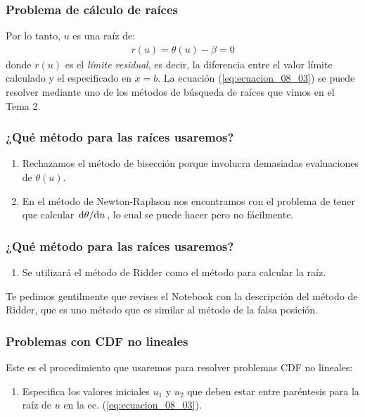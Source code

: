 \documentclass[12pt]{beamer}
\begin{document}
\begin{frame}
\frametitle{Problema de cálculo de raíces}
Por lo tanto, \pause $u$ es una raíz de:
\pause
\begin{align}
r (u) = \theta (u) - \beta = 0
\label{eq:ecuacion_08_03}
\end{align}
\pause
donde $r (u)$ es el \emph{límite residual}, es decir, la diferencia entre el valor límite calculado y el especificado en $x = b$. \pause La ecuación (\ref{eq:ecuacion_08_03}) se puede resolver mediante uno de los métodos de búsqueda de raíces que vimos en el Tema 2.
\end{frame}
\begin{frame}
\frametitle{¿Qué método para las raíces usaremos?}
\begin{enumerate}[<+->]
\item Rechazamos el método de bisección porque involucra demasiadas evaluaciones de $\theta (u)$.
\item En el método de Newton-Raphson nos encontramos con el problema de tener que calcular $\dv*{\theta}{u}$, lo cual se puede hacer pero no fácilmente.
\seti
\end{enumerate}
\end{frame}
\begin{frame}
\frametitle{¿Qué método para las raíces usaremos?}
\begin{enumerate}[<+->]
\conti
\item Se utilizará el método de Ridder como el método para calcular la raíz.
\end{enumerate}
\pause
Te pedimos gentilmente que revises el Notebook con la descripción del método de Ridder, que es uno método que es similar al método de la falsa posición.
\end{frame}
\begin{frame}
\frametitle{Problemas con CDF no lineales}
Este es el procedimiento que usaremos para resolver problemas CDF no lineales:
\pause
{}
\begin{enumerate}[<+->]
\item Especifica los valores iniciales $u_{1}$ y $u_{2}$ que deben estar entre paréntesis para la raíz de $u$ en la ec. (\ref{eq:ecuacion_08_03}).
\seti
\end{enumerate}
\end{frame}
\end{document}
